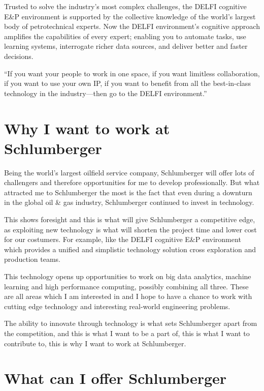 \documentclass[12pt,a4paper]{article}
\DeclareRobustCommand{\rrheader}[1]{\par\medskip\phantomsection\noindent{\normalsize\textbf{#1}}\medskip}
\begin{document}
Trusted to solve the industry's most complex challenges, the DELFI cognitive
E\&P environment is supported by the collective knowledge of the world's
largest body of petrotechnical experts. Now the DELFI environment's
cognitive approach amplifies the capabilities of every expert; enabling you
to automate tasks, use learning systems, interrogate richer data sources,
and deliver better and faster decisions.

\rrheader{Why the DELFI environment?}

``If you want your people to work in one space, if you want limitless
collaboration, if you want to use your own IP, if you want to benefit from
all the best-in-class technology in the industry---then go to the DELFI
environment.''



\section{Why I want to work at Schlumberger}


Being the world's largest oilfield service company, Schlumberger will offer
lots of challengers and therefore opportunities for me to develop
professionally. But what attracted me to Schlumberger the most is the fact
that even during a downturn in the global oil \& gas industry, Schlumberger
continued to invest in technology.

This shows foresight and this is what will give Schlumberger a competitive
edge, as exploiting new technology is what will shorten the project time and
lower cost for our costumers. For example, like the DELFI cognitive E\&P
environment which provides a unified and simplistic technology solution
cross exploration and production teams.

This technology opens up opportunities to work on big data analytics,
machine learning and high performance computing, possibly combining all
three. These are all areas which I am interested in and I hope to have a
chance to work with cutting edge technology and interesting real-world
engineering problems.

The ability to innovate through technology is what sets Schlumberger apart
from the competition, and this is what I want to be a part of, this is what
I want to contribute to, this is why I want to work at Schlumberger.


\section{What can I offer Schlumberger}
 
\end{document}
